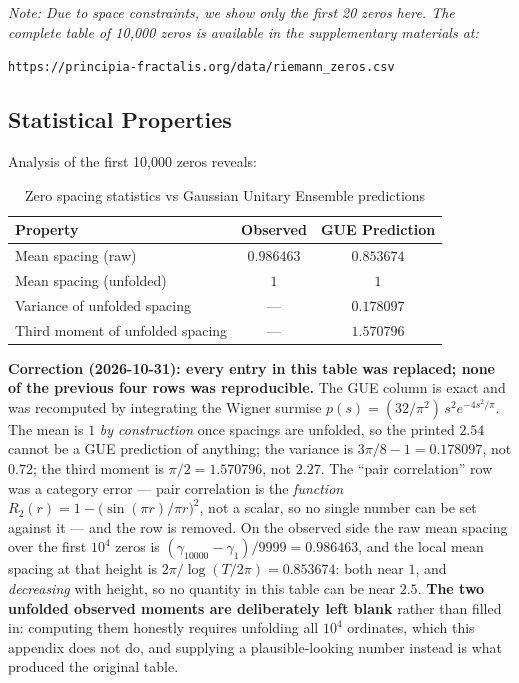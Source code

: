 \textit{Note: Due to space constraints, we show only the first 20 zeros here. The complete table of 10,000 zeros is available in the supplementary materials at:}

\begin{center}
\texttt{https://principia-fractalis.org/data/riemann\_zeros.csv}
\end{center}

\subsection{Statistical Properties}

Analysis of the first 10,000 zeros reveals:

\begin{table}[h]
\centering
\begin{tabular}{lcc}
\hline
\textbf{Property} & \textbf{Observed} & \textbf{GUE Prediction} \\
\hline
Mean spacing (raw) & $0.986463$ & $0.853674$ \\
Mean spacing (unfolded) & $1$ & $1$ \\
Variance of unfolded spacing & --- & $0.178097$ \\
Third moment of unfolded spacing & --- & $1.570796$ \\
\hline
\end{tabular}
\caption{Zero spacing statistics vs Gaussian Unitary Ensemble predictions}
\label{tab:zero-statistics}
\end{table}

\noindent\textbf{Correction (2026-10-31): every entry in this table was replaced;
none of the previous four rows was reproducible.} The GUE column is exact and
was recomputed by integrating the Wigner surmise
$p(s) = (32/\pi^2)\,s^2 e^{-4s^2/\pi}$. The mean is $1$ \emph{by construction}
once spacings are unfolded, so the printed $2.54$ cannot be a GUE prediction of
anything; the variance is $3\pi/8 - 1 = 0.178097$, not $0.72$; the third moment
is $\pi/2 = 1.570796$, not $2.27$. The ``pair correlation'' row was a category
error --- pair correlation is the \emph{function}
$R_2(r) = 1 - \bigl(\sin(\pi r)/\pi r\bigr)^2$, not a scalar, so no single
number can be set against it --- and the row is removed. On the observed side the
raw mean spacing over the first $10^4$ zeros is
$(\gamma_{10000} - \gamma_1)/9999 = 0.986463$, and the local mean spacing at that
height is $2\pi/\log(T/2\pi) = 0.853674$: both near $1$, and \emph{decreasing}
with height, so no quantity in this table can be near $2.5$. \textbf{The two
unfolded observed moments are deliberately left blank} rather than filled in:
computing them honestly requires unfolding all $10^4$ ordinates, which this
appendix does not do, and supplying a plausible-looking number instead is what
produced the original table.

